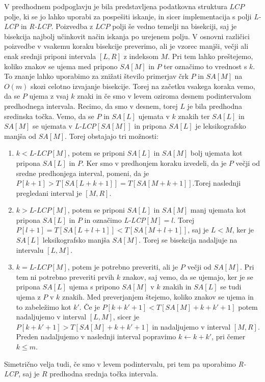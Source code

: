 V predhodnem podpoglavju je bila predstavljena podatkovna struktura $LCP$ polje, ki se jo lahko uporabi za pospešiti iskanje, in sicer implementacija s polji \textit{L-LCP} in \textit{R-LCP}. Poizvedba z $LCP$ polji še vedno temelji na bisekciji, saj je bisekcija najbolj učinkovit način iskanja po urejenem polju. V osnovni različici poizvedbe v vsakemu koraku bisekcije preverimo, ali je vzorec manjši, večji ali enak srednji priponi intervala $[L,R]$ z indeksom $M$. Pri tem lahko preštejemo, koliko znakov se ujema med pripono $SA[M]$ in $P$ ter označimo to vrednost s $k$. To znanje lahko uporabimo za znižati število primerjav črk $P$ in $SA[M]$ na $O(m)$ skozi celotno izvajanje bisekcije. Torej na začetku vsakega koraka vemo, da se $P$ ujema z vsaj $k$ znaki in če smo v levem oziroma desnem podintervalom predhodnega intervala. Recimo, da smo v desnem, torej $L$ je bila predhodna sredinska točka. Vemo, da se $P$ in $SA[L]$ ujemata v $k$ znakih ter $SA[L]$ in $SA[M]$ se ujemata v \textit{L-LCP}$[SA[M]]$ in pripona $SA[L]$ je leksikografsko manjša od $SA[M]$. Torej obstajajo tri možnosti:
\begin{enumerate}
    \item $k<\textit{L-LCP}[M]$, potem se priponi $SA[L]$ in $SA[M]$ bolj ujemata kot pripona $SA[L]$ in $P$. Ker smo v predhonjem koraku izvedeli, da je $P$ večji od sredne predhonjega interval, pomeni, da je $P[k+1]>T[SA[L+k+1]]=T[SA[M+k+1]]$.Torej naslednji pregledani interval je $[M,R]$.
    \item $k>\textit{L-LCP}[M]$, potem se priponi $SA[L]$ in $SA[M]$ manj ujemata kot pripona $SA[L]$ in $P$ in označimo \textit{L-LCP}$[M]=l$. Torej $P[l+1]=T[SA[L+l+1]]<T[SA[M+l+1]]$, saj je $L<M$, ker je $SA[L]$ leksikografsko manjša $SA[M]$. Torej se bisekcija nadaljuje na intervalu $[L,M]$.
    \item $k=\textit{L-LCP}[M]$, potem je potrebno preveriti, ali je $P$ večji od $SA[M]$. Pri tem ni potrebno preveriti prvih $k$ znakov, saj vemo, da se ujemajo, ker je se pripona $SA[L]$ ujema s pripono $SA[M]$ v $k$ znakih in $SA[L]$ se tudi ujema z $P$ v $k$ znakih. Med preverjanjem štejemo, koliko znakov se ujema in to zabeležimo kot $k'$. Če je $P[k+k'+1]<T[SA[M]+k+k'+1]$ potem nadaljujemo v interval $[L,M]$, sicer je $P[k+k'+1]>T[SA[M]+k+k'+1]$ in nadaljujemo v interval $[M,R]$. Preden nadaljujemo v naslednji interval popravimo $k\leftarrow k+k'$, pri čemer $k\le m$.
\end{enumerate}
Simetrično velja tudi, če smo v levem podintervalu, pri tem pa uporabimo \textit{R-LCP}, saj je $R$ predhodna srednja točka intervala.

